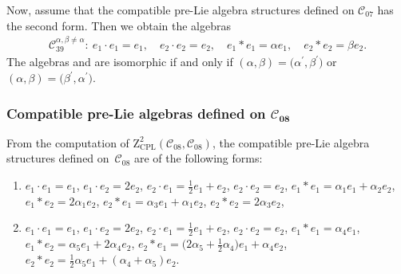 \documentclass[10pt,a4paper]{amsart}
\numberwithin{equation}{section}
\begin{document}
Now, assume that the compatible pre-Lie algebra structures defined on $\mathcal{C%
}_{07}$ has the second form. Then we obtain the algebras
\begin{gather*}
\mathcal{C}_{39}^{\alpha ,\beta \neq \alpha } \colon \
e_{1}\cdot e_{1}=e_{1}, \quad e_{2}\cdot e_{2}=e_{2}, \quad
e_{1}\ast e_{1}=\alpha e_{1}, \quad e_{2}\ast e_{2}=\beta e_{2}.
\end{gather*}
The algebras  and \smash{$\mathcal{C}_{39}^{\alpha
^{\prime },\beta ^{\prime }}$} are isomorphic if and only if
$(\alpha,\beta)= \bigl(\alpha^{\prime },\beta ^{\prime }\bigr)$ or
$(\alpha,\beta)= \bigl(\beta^{\prime },\alpha ^{\prime }\bigr)$.


\subsubsection[Compatible pre-Lie algebras defined on C\_\{08\}]{Compatible pre-Lie algebras defined on $\boldsymbol{\mathcal{C}_{08}}$}

From the computation of $\mathrm{Z}_{\mathrm{CPL}}^{2}(\mathcal{C}_{08},%
\mathcal{C}_{08})$, the compatible pre-Lie algebra structures defined on~$%
\mathcal{C}_{08}$ are of the following forms:
\begin{enumerate}\itemsep=0pt
\item[(1)] $e_{1}\cdot e_{1}=e_{1}$, $e_{1}\cdot e_{2}=2e_{2}$, $e_{2}\cdot e_{1}=%
\frac{1}{2}e_{1}+e_{2}$, $e_{2}\cdot e_{2}=e_{2}$,
$e_{1}\ast e_{1}=\alpha _{1}e_{1}+\alpha _{2}e_{2}$, $e_{1}\ast
e_{2}=2\alpha _{1}e_{2}$, $e_{2}\ast e_{1}=\alpha _{3}e_{1}+\alpha
_{1}e_{2}$, $e_{2}\ast e_{2}=2\alpha _{3}e_{2}$,

\item[(2)] $e_{1}\cdot e_{1}=e_{1}$, $e_{1}\cdot e_{2}=2e_{2}$, $e_{2}\cdot e_{1}=
\frac{1}{2}e_{1}+e_{2}$, $e_{2}\cdot e_{2}=e_{2}$,
$e_{1}\ast e_{1}=\alpha _{4}e_{1}$, $e_{1}\ast e_{2}=\alpha
_{5}e_{1}+2\alpha _{4}e_{2}$,
$e_{2}\ast e_{1}=\bigl( 2\alpha _{5}+\frac{1%
}{2}\alpha _{4}\bigr) e_{1}+\alpha _{4}e_{2}$, $e_{2}\ast e_{2}=\frac{1}{2
}\alpha _{5}e_{1}+( \alpha _{4}+\alpha _{5}) e_{2}$.
\end{enumerate}
\end{document}
